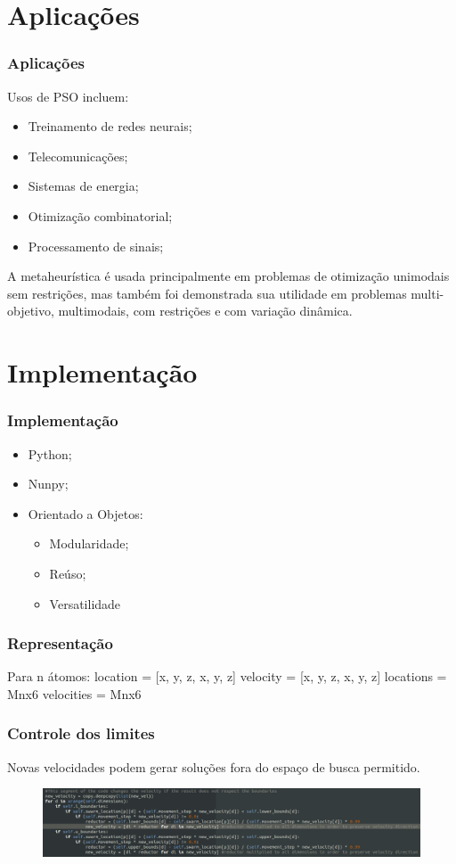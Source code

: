 \documentclass{beamer}
\begin{document}
\section{Aplicações}

\begin{frame}
\frametitle{Aplicações}
Usos de PSO incluem:
\begin{itemize}
\item Treinamento de redes neurais;
\item Telecomunicações;
\item Sistemas de energia;
\item Otimização combinatorial;
\item Processamento de sinais;
\end{itemize}
A metaheurística é usada principalmente em problemas de otimização unimodais sem restrições, mas também foi demonstrada sua utilidade em problemas multi-objetivo, multimodais, com restrições e com variação dinâmica. 
\end{frame}

\section{Implementação}

\begin{frame}
\frametitle{Implementação}
\begin{itemize}
\item Python;
\item Nunpy;
\item Orientado a Objetos:
\begin{itemize}
\item Modularidade;
\item Reúso;
\item Versatilidade
\end{itemize}
\end{itemize}
\end{frame}

\begin{frame}
\frametitle{Representação}
Para n átomos:
location = [x, y, z, x, y, z]
velocity = [x, y, z, x, y, z]
locations = Mnx6
velocities = Mnx6
\end{frame}

\begin{frame}
\frametitle{Controle dos limites}
Novas velocidades podem gerar soluções fora do espaço de busca permitido.
\begin{figure}
\includegraphics[width=1.0\linewidth]{pylimit.png}
\end{figure}
\end{frame}
\end{document}
